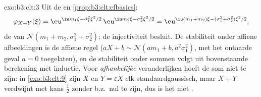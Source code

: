 \begin{solution}{exo:b3:clt:3}
Uit de  en \cref{prop:b3:clt:cfbasics}:
\[
\varphi_{X+Y}(\xi) = \eu^{\iu m_1\xi - \sigma_1^2\xi^2/2}\,
\eu^{\iu m_2\xi - \sigma_2^2\xi^2/2}
= \eu^{\iu(m_1+m_2)\xi - (\sigma_1^2+\sigma_2^2)\xi^2/2},
\]
de  van $\mathcal N(m_1 + m_2,
\sigma_1^2 + \sigma_2^2)$; de injectiviteit besluit. De
stabiliteit onder affiene afbeeldingen is de affiene regel
($aX + b \sim \mathcal N(am_1 + b, a^2\sigma_1^2)$, met het
ontaarde geval $a = 0$ toegelaten), en de stabiliteit onder
 sommen volgt uit bovenstaande berekening met
inductie. Voor \emph{afhankelijke} 
veranderlijken hoeft de som niet  te zijn: in
\cref{exo:b3:clt:9} zijn $X$ en $Y = \varepsilon X$ elk
standaardgaussisch, maar $X + Y$ verdwijnt met kans
$\frac12$ zonder b.z.\ nul te zijn, dus is het niet
.
\end{solution}


